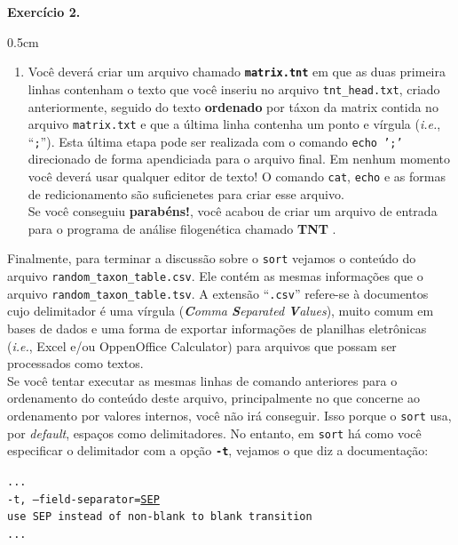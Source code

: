 \begin{refsection}
\begin{blackBlock}{\textbf{Exercício 2.}}
\begin {myindentpar}{0.5cm}
\begin{enumerate}[\itshape i.]
 \item{Você deverá criar um arquivo chamado \textbf{\texttt{matrix.tnt}} em que as duas primeira linhas contenham o texto que você inseriu no arquivo \texttt{tnt\_head.txt}, criado anteriormente, seguido do texto \textbf{ordenado} por táxon da matrix contida no arquivo \texttt{matrix.txt} e que a última linha contenha um ponto e vírgula (\textit{i.e.}, ``\texttt{;}''). Esta última etapa pode ser realizada com o comando \texttt{echo ';'} direcionado de forma apendiciada para o arquivo final. Em nenhum momento você deverá usar qualquer editor de texto! O comando \texttt{cat}, \texttt{echo} e as formas de redicionamento são suficienetes para criar esse arquivo. }\label{tut2:text:editors:texttools:sort:ex3}\\

Se você conseguiu \textbf{parabéns!}, você acabou de criar um arquivo de entrada para o programa de análise filogenética chamado \textbf{TNT} \parencite{GoloboffEtAl_2008}.
	
\end{enumerate}
\end{myindentpar}
\end{blackBlock}


Finalmente, para terminar a discussão sobre o \texttt{sort} vejamos o conteúdo do arquivo \texttt{random\_taxon\_table.csv}. Ele contém as mesmas informações que o arquivo \texttt{random\_taxon\_table.tsv}. A extensão ``\texttt{.csv}'' refere-se à documentos cujo delimitador é uma vírgula (\textit{\textbf{C}omma \textbf{S}eparated \textbf{V}alues}), muito comum em bases de dados e uma forma de exportar informações de planilhas eletrônicas (\textit{i.e.}, Excel e/ou OppenOffice Calculator) para arquivos que possam ser processados como textos.\\

Se você tentar executar as mesmas linhas de comando anteriores para o ordenamento do conteúdo deste arquivo, principalmente no que concerne ao ordenamento por valores internos, você não irá conseguir. Isso porque o \texttt{sort} usa, por \textit{default}, espaços como delimitadores. No entanto, em \texttt{sort} há como você especificar o delimitador com a opção \texttt{\textbf{-t}}, vejamos o que diz a documentação:


\texttt{...}\\
\texttt{-t, --field-separator=\underline{SEP}}\\
\indent\texttt{use SEP instead of non-blank to blank transition}\\
\texttt{...}\\


\end{refsection}
